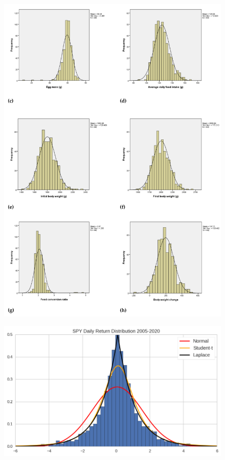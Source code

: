 \documentclass[compress]{beamer}
\begin{document}
\begin{frame}
	\begin{figure}
		\centering
		\includegraphics[scale=0.05]{Picture/hen eggs.png}
	\end{figure}
\end{frame}

\begin{frame}
	\begin{figure}
		\centering
		\includegraphics[scale=0.6]{Picture/SPY returns.png}
	\end{figure}
\end{frame}
\end{document}
